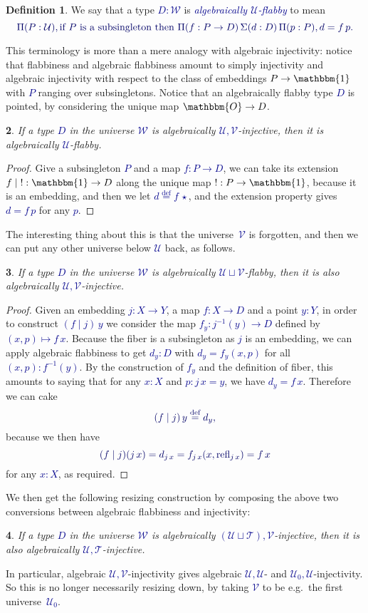 \documentclass[10pt]{article}
\newcommand{\db}{\textcolor{darkblue}}
\newcommand{\df}[1]{\emph{\db{#1}}}
\newcommand{\m}[1]{\db{$#1$}}
\newcommand{\M}[1]{\[\db{#1}\]}
\newcommand{\U}{\mathcal{U}}
\newcommand{\V}{\mathcal{V}}
\newcommand{\W}{\mathcal{W}}
\newcommand{\T}{\mathcal{T}}
\newcommand{\Zero}{\mathbbm{O}}
\newcommand{\One}{\mathbbm{1}}
\newcommand{\one}{\operatorname{\star}}
\newcommand{\refl}{\operatorname{refl}}
\newcommand{\eqdef}{\overset{\text{def}}{=}}
\newtheorem{numbered}{}
\theoremstyle{definition}
\newtheorem{definition}[numbered]{Definition}
\begin{document}
\begin{definition}
  We say that a type \m{D : \W} is \df{algebraically \m{\U}-flabby} to mean
%
\M{
  \Pi (P : \U), \text{if \m{P} is a subsingleton then \m{\Pi(f : P \to D)\, \Sigma (d : D)\, \Pi(p : P), d = f \, p}.}
}
%
\end{definition}
\noindent This terminology is more than a mere analogy with
algebraic injectivity: notice that flabbiness and algebraic flabbiness
amount to simply injectivity and algebraic injectivity with respect to
the class of embeddings \m{P \to \One} with \m{P} ranging over
subsingletons. Notice that an algebraically flabby type \m{D} is pointed, by considering the unique map \m{\Zero \to D}.

\begin{numbered}
  If a type \m{D} in the universe \m{\W} is algebraically
  \m{\U,\V}-injective, then it is algebraically \m{\U}-flabby.
\end{numbered}
\begin{proof}
  Give a subsingleton \m{P} and a map \m{f : P \to D}, we can take its extension \m{f \mid \operatorname{!}: \One \to D} along the unique map \m{!:P \to \One}, because it is an embedding, and then we let \m{d \eqdef f \, \one}, and the extension property gives \m{d = f \, p} for any \m{p}.
\end{proof}
The interesting thing about this is that the
universe~\m{\V} is forgotten, and then we can put any other universe
below \m{\U} back, as follows.

\begin{numbered}
  If a type \m{D} in the universe \m{\W} is algebraically \m{\U \sqcup
    \V}-flabby, then it is also algebraically \m{\U,\V}-injective.
\end{numbered}
\begin{proof}
  Given an embedding \m{j : X \to Y}, a map \m{f : X \to D} and a
  point \m{y:Y}, in order to construct \m{(f \mid j) \, y} we consider
  the map \m{f_y : j^{-1}(y) \to D} defined by \m{(x,p) \mapsto
    f\,x}. Because the fiber is a subsingleton as \m{j} is an
  embedding, we can apply algebraic flabbiness to get \m{d_y : D} with
  \m{d_y = f_y (x,p)} for all \m{(x,p):f^{-1}(y)}. By the construction of
  \m{f_y} and the definition of fiber, this amounts to saying that for
  any \m{x : X} and \m{p : j \, x = y}, we have \m{d_y = f \,
    x}. Therefore we can cake
%
\M{(f \mid j) \, y \eqdef d_y,}
because we then have
%
\M{(f \mid j) (j \, x) = d_{j \, x} = f_{j \, x} (x , \refl_{j \, x}) = f \, x}
%
for any \m{x:X}, as required.
\end{proof}
\noindent We then get the following resizing construction by composing the above
two conversions between algebraic flabbiness and injectivity:
\begin{numbered}
  If a type \m{D} in the universe \m{\W} is algebraically \m{(\U \sqcup
    \T),\V}-injective, then it is also algebraically \m{\U,\T}-injective.
\end{numbered}
\noindent In particular, algebraic \m{\U,\V}-injectivity gives
algebraic \m{\U,\U}- and \m{\U_0,\U}-injectivity.  So this is no
longer necessarily resizing down, by taking \m{\V} to be
e.g.\ the first universe~\m{\U_0}.
\end{document}

